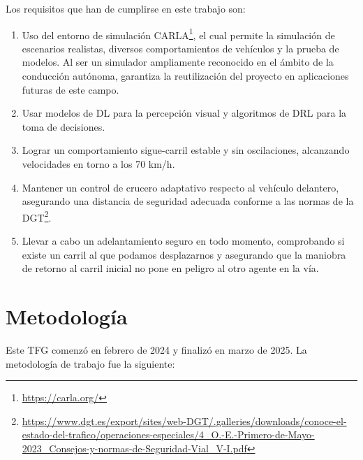 Los requisitos que han de cumplirse en este trabajo son:
\begin{enumerate}
\item Uso del entorno de simulación CARLA\footnote{\url{https://carla.org/}}, el cual permite la simulación de escenarios realistas, diversos comportamientos de vehículos y la prueba de modelos. Al ser un simulador ampliamente reconocido en el ámbito de la conducción autónoma, garantiza la reutilización del proyecto en aplicaciones futuras de este campo.
\item Usar modelos de \ac{DL} para la percepción visual y algoritmos de \ac{DRL} para la toma de decisiones.
\item Lograr un comportamiento sigue-carril estable y sin oscilaciones, alcanzando velocidades en torno a los 70 km/h.
\item Mantener un control de crucero adaptativo respecto al vehículo delantero, asegurando una distancia de seguridad adecuada conforme a las normas de la \ac{DGT}\footnote{\url{https://www.dgt.es/export/sites/web-DGT/.galleries/downloads/conoce-el-estado-del-trafico/operaciones-especiales/4_O.-E.-Primero-de-Mayo-2023_Consejos-y-normas-de-Seguridad-Vial_V-I.pdf}}.
\item Llevar a cabo un adelantamiento seguro en todo momento, comprobando si existe un carril al que podamos desplazarnos y asegurando que la maniobra de retorno al carril inicial no pone en peligro al otro agente en la vía.
\end{enumerate}

\section{Metodología}
\label{sec:metodologia}

Este TFG comenzó en febrero de 2024 y finalizó en marzo de 2025. La metodología de trabajo fue la siguiente:

